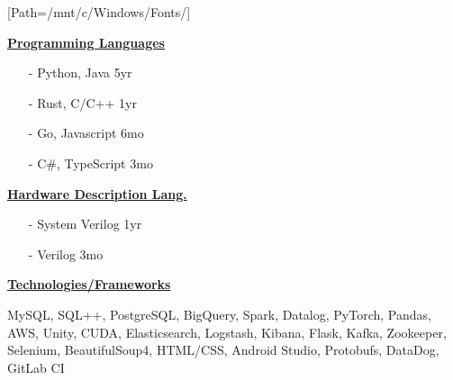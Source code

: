 \documentclass{WeiAndrew}
\begin{document}
[Path=/mnt/c/Windows/Fonts/]
\setlength{\topskip}{0pt}
\noindent{}%
{%
    \hspace{0.02\textwidth}
    \begin{minipage}[t][\textheight-2\fboxsep-2\fboxrule][t]{0.25\textwidth}
        \color{white}
        \vspace{12px}
        \vspace{12px}
        \vspace{12px}

        \begin{itemize}[align=center, leftmargin=7.5mm]
        \end{itemize}
        \vspace{12px}

        \textbf{\underline{Programming Languages}}
        \begin{itemize}[leftmargin=4mm, rightmargin=20px]
            \item[-] Python, Java    \hfill 5yr
            \item[-] Rust, C/C++     \hfill 1yr
            \item[-] Go, Javascript  \hfill 6mo
            \item[-] C\#, TypeScript \hfill 3mo
        \end{itemize}
        \vspace{12px}

        \noindent\textbf{\underline{Hardware Description Lang.}}
        \begin{itemize}[leftmargin=4mm, rightmargin=20px]
            \item[-] System Verilog \hfill 1yr
            \item[-] Verilog        \hfill 3mo
        \end{itemize}
        \vspace{12px}

        \textbf{\underline{Technologies/Frameworks}}
        \raggedright MySQL, SQL++, PostgreSQL, BigQuery,
        Spark, Datalog, PyTorch,
        Pandas, AWS, Unity, CUDA,
        Elasticsearch, Logstash,
        Kibana, Flask, Kafka,
        Zookeeper, Selenium,
        BeautifulSoup4, HTML/CSS,
        Android Studio, Protobufs,
        DataDog, GitLab CI
        \vspace{12px}


\end{minipage}}
\end{document}

